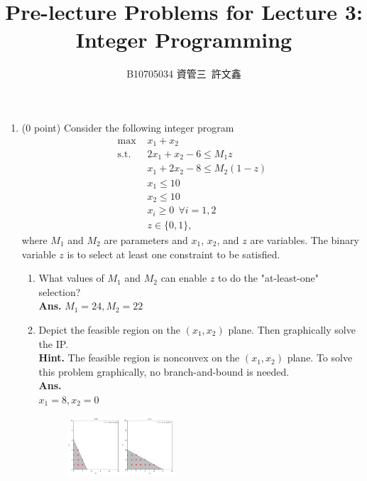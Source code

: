 \documentclass[12pt]{article}
\title{Pre-lecture Problems for Lecture 3:\\ Integer Programming}
\author{B10705034 資管三\ 許文鑫}
\begin{document}
\maketitle
\begin{enumerate}
      \item (0 point) Consider the following integer
            program
            \begin{align*}
                  \text{max }  & x_1 + x_2                      \\
                  \text{s.t. } & 2x_1 + x_2 - 6 \leq M_1z       \\
                               & x_1 + 2x_2 - 8 \leq M_2(1-z)   \\
                               & x_1 \leq 10                    \\
                               & x_2 \leq 10                    \\
                               & x_i \geq 0 \ \ \forall i = 1,2 \\
                               & z \in \{0,1\},
            \end{align*}
            where $M_1$ and $M_2$ are parameters and $x_1$, $x_2$, and $z$ are variables. The binary variable $z$ is to select at least one constraint to be satisfied.
            \begin{enumerate}
                  \item What values of $M_1$ and $M_2$ can enable $z$ to do the "at-least-one" selection?\\
                        \textbf{Ans. }
                        $M_1 = 24, M_2 = 22$
                  \item Depict the feasible region on the $(x_1,x_2)$ plane. Then graphically solve the IP.\\
                        \textbf{Hint.} The feasible region is nonconvex on the $(x_1,x_2)$ plane. To solve this problem graphically, no branch-and-bound is needed.\\
                        \textbf{Ans. }\\
                        $x_1= 8,x_2=0$
                        \begin{figure}[H]
                              \centering
                              \includegraphics[width=0.4\textwidth]{p1.png}

\end{figure}
\end{enumerate}
\end{enumerate}
\end{document}
